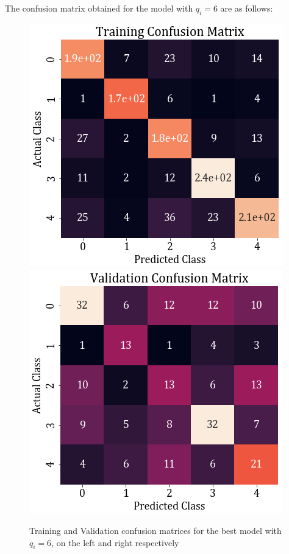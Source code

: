 \documentclass[11pt,a4paper]{article}
\newcommand{\noi}{\noindent}
\begin{document}
\noi
The confusion matrix obtained for the model with $q_i=6$ are as follows:
\begin{figure}[H]
    \centering
    \includegraphics[scale=0.5]{images/2A/2A_full_train_conf.png}
    \includegraphics[scale=0.5]{images/2A/2A_full_val_conf.png}
    \caption{Training and Validation confusion matrices for the best model with $q_i=6$, on the left and right respectively}
\end{figure}
\end{document}
